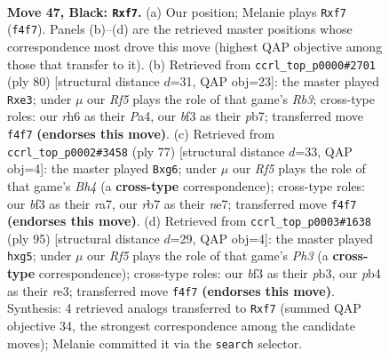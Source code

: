 \documentclass[11pt]{article}
\begin{document}
\clearpage

\begin{figure}[p]\centering
\begin{subfigure}{0.46\textwidth}\centering
\resizebox{\linewidth}{!}{%
\newchessgame
\chessboard[
  setfen={5k2/1R3P2/7R/8/1P3r1p/4KB2/2r5/8 b - - 2 47},
  showmover=false,
  pgfstyle=straightmove, color=movearrow, markmove={f4-f7}
]}
\caption{}
\end{subfigure}\hfill
\begin{subfigure}{0.46\textwidth}\centering
\resizebox{\linewidth}{!}{%
\newchessgame
\chessboard[
  setfen={4r3/pp6/8/8/P5P1/1R2pK2/2k5/8 w - - 0 41},
  showmover=false,
  pgfstyle=straightmove, color=movearrow, markmove={b3-e3}
]}
\caption{}
\end{subfigure}
\\[4pt]
\begin{subfigure}{0.46\textwidth}\centering
\resizebox{\linewidth}{!}{%
\newchessgame
\chessboard[
  setfen={8/R3N3/1p3kP1/7b/8/8/Pr3P2/6K1 b - - 0 39},
  showmover=false,
  pgfstyle=straightmove, color=movearrow, markmove={h5-g6}
]}
\caption{}
\end{subfigure}\hfill
\begin{subfigure}{0.46\textwidth}\centering
\resizebox{\linewidth}{!}{%
\newchessgame
\chessboard[
  setfen={8/1r6/7p/6Pk/2R5/KP2R1P1/8/6r1 b - - 0 48},
  showmover=false,
  pgfstyle=straightmove, color=movearrow, markmove={h6-g5}
]}
\caption{}
\end{subfigure}
\caption{\textbf{Move 47, Black: \texttt{Rxf7}.} (a) Our position; Melanie plays \texttt{Rxf7} (\texttt{f4f7}). Panels (b)--(d) are the retrieved master positions whose correspondence most drove this move (highest QAP objective among those that transfer to it). (b) Retrieved from \texttt{ccrl\_top\_p0000\#2701} (ply 80) [structural distance $d$=31, QAP obj=23]: the master played \texttt{Rxe3}; under $\mu$ our \emph{Rf5} plays the role of that game's \emph{Rb3}; cross-type roles: our \emph{r}h6 as their \emph{P}a4, our \emph{b}f3 as their \emph{p}b7; transferred move \texttt{f4f7} \textbf{(endorses this move)}. (c) Retrieved from \texttt{ccrl\_top\_p0002\#3458} (ply 77) [structural distance $d$=33, QAP obj=4]: the master played \texttt{Bxg6}; under $\mu$ our \emph{Rf5} plays the role of that game's \emph{Bh4} (a \textbf{cross-type} correspondence); cross-type roles: our \emph{b}f3 as their \emph{r}a7, our \emph{r}b7 as their \emph{n}e7; transferred move \texttt{f4f7} \textbf{(endorses this move)}. (d) Retrieved from \texttt{ccrl\_top\_p0003\#1638} (ply 95) [structural distance $d$=29, QAP obj=4]: the master played \texttt{hxg5}; under $\mu$ our \emph{Rf5} plays the role of that game's \emph{Ph3} (a \textbf{cross-type} correspondence); cross-type roles: our \emph{b}f3 as their \emph{p}b3, our \emph{p}b4 as their \emph{r}e3; transferred move \texttt{f4f7} \textbf{(endorses this move)}. Synthesis: 4 retrieved analogs transferred to \texttt{Rxf7} (summed QAP objective 34, the strongest correspondence among the candidate moves); Melanie committed it via the \texttt{search} selector.}
\label{fig:thought-m93}
\end{figure}
\end{document}
